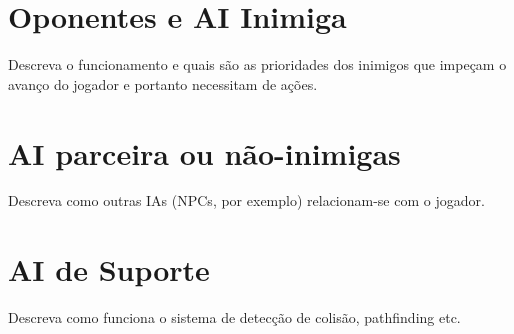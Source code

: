 
\section{Oponentes e AI Inimiga}

Descreva o funcionamento e quais são as prioridades dos inimigos que impeçam o avanço do jogador e portanto necessitam de ações.

\section{AI parceira ou não-inimigas}

Descreva como outras IAs (NPCs, por exemplo) relacionam-se com o jogador.

\section{AI de Suporte}
Descreva como funciona o sistema de detecção de colisão, pathfinding etc.